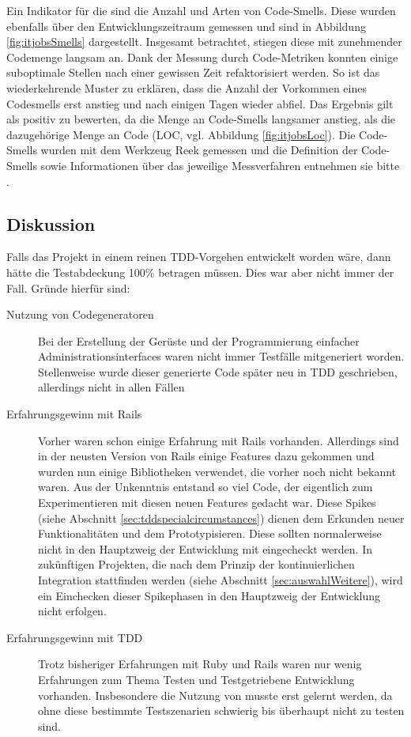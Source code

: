Ein Indikator für die  sind die Anzahl und Arten von Code-Smells. Diese wurden ebenfalls über den Entwicklungszeitraum gemessen und sind in Abbildung \ref{fig:itjobsSmells} dargestellt. Insgesamt betrachtet, stiegen diese mit zunehmender Codemenge langsam an. Dank der Messung durch Code-Metriken konnten einige suboptimale Stellen nach einer gewissen Zeit refaktorisiert werden. So ist das wiederkehrende Muster zu erklären, dass die Anzahl der Vorkommen eines Codesmells erst anstieg und nach einigen Tagen wieder abfiel. Das Ergebnis gilt als positiv zu bewerten, da die Menge an Code-Smells langsamer anstieg, als die dazugehörige Menge an Code (LOC, vgl. Abbildung \ref{fig:itjobsLoc}). Die Code-Smells wurden mit dem Werkzeug Reek gemessen und die Definition der Code-Smells sowie Informationen über das jeweilige Messverfahren entnehmen sie bitte \citep{kevin_rutherford_code_2010}.

\subsection*{Diskussion}
Falls das Projekt in einem reinen TDD-Vorgehen entwickelt worden wäre, dann hätte die Testabdeckung 100\% betragen müssen. Dies war aber nicht immer der Fall. Gründe hierfür sind:
\begin{description}
 \item[Nutzung von Codegeneratoren] Bei der Erstellung der Gerüste und der Programmierung einfacher Administrationsinterfaces waren nicht immer Testfälle mitgeneriert worden. Stellenweise wurde dieser generierte Code später neu in TDD geschrieben, allerdings nicht in allen Fällen
 \item[Erfahrungsgewinn mit Rails] Vorher waren schon einige Erfahrung mit Rails vorhanden. Allerdings sind in der neusten Version von Rails einige Features dazu gekommen und wurden nun einige Bibliotheken verwendet, die vorher noch nicht bekannt waren. Aus der Unkenntnis entstand so viel Code, der eigentlich zum Experimentieren mit diesen neuen Features gedacht war. Diese Spikes (siehe Abschnitt \ref{sec:tddspecialcircumstances}) dienen dem Erkunden neuer Funktionalitäten und dem Prototypisieren. Diese sollten normalerweise nicht in den Hauptzweig der Entwicklung mit eingecheckt werden. In zukünftigen Projekten, die nach dem Prinzip der kontinuierlichen Integration stattfinden werden (siehe Abschnitt \ref{sec:auswahlWeitere}), wird ein Einchecken dieser Spikephasen in den Hauptzweig der Entwicklung nicht erfolgen.
 \item[Erfahrungsgewinn mit TDD] Trotz bisheriger Erfahrungen mit Ruby und Rails waren nur wenig Erfahrungen zum Thema Testen und Testgetriebene Entwicklung vorhanden. Insbesondere die Nutzung von  musste erst gelernt werden, da ohne diese bestimmte Testszenarien schwierig bis überhaupt nicht zu testen sind.
\end{description}

